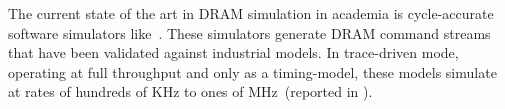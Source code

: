 The current state of the art in DRAM simulation in academia is cycle-accurate
software simulators like~\cite{dramsim, ramulator, usimm}. These simulators
generate DRAM command streams that have been validated against industrial
models. In trace-driven mode, operating at full throughput and only as a
timing-model, these models simulate at rates of
hundreds of KHz to ones of MHz~(reported in \cite{ramulator}).
%


